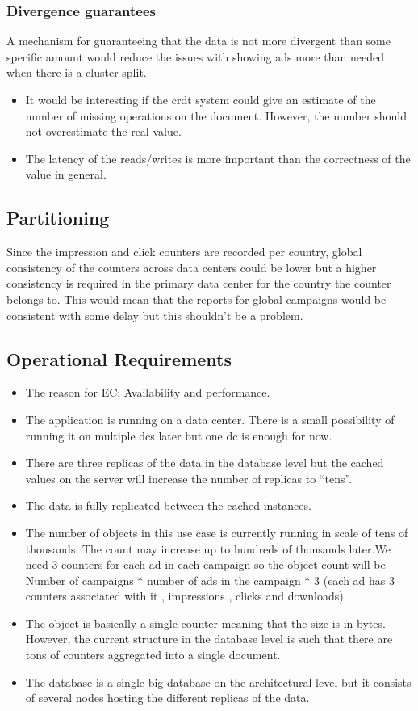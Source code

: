 \documentclass[11pt,a4paper]{report}
\begin{document}
\subsubsection{Divergence guarantees}
A mechanism for guaranteeing that the data is not more divergent than some specific amount would reduce the issues with showing ads more than needed when there is a cluster split.

\begin{itemize}
\item It would be interesting if the \gls{crdt} system could give an estimate of the number of missing operations on the document. However, the number should not overestimate the real value.
\item The latency of the reads/writes is more important than the correctness of the value in general.
\end{itemize}

\subsection{Partitioning}
Since the impression and click counters are recorded per country, global consistency of the counters across data centers could be lower but a  higher consistency is required in the primary data center for the country the counter belongs to. This would mean that the reports for global campaigns would be consistent with some delay but this shouldn't be a problem.

\subsection{Operational Requirements}
\begin{itemize}
\item The reason for EC: Availability and performance.
\item The application is running on a data center. There is a small possibility of running it on multiple \glspl{dc} later but one \gls{dc} is enough for now.
\item There are three replicas of the data in the database level but the cached values on the server will increase the number of replicas to ``tens''.
\item The data is fully replicated between the cached instances.
\item The number of objects in this use case is currently running in scale of tens of thousands. The count may increase up to hundreds of thousands later.We need 3 counters for each ad in each campaign so the object count will be Number of campaigns * number of ads in the campaign * 3 (each ad has 3 counters associated with it , impressions , clicks and downloads)
\item The object is basically a single counter meaning that the size is in bytes. However, the current structure in the database level is such that there are tons of counters aggregated into a single document.
\item The database is a single big database on the architectural level but it consists of several nodes hosting the different replicas of the data.
\end{itemize}
\end{document}
